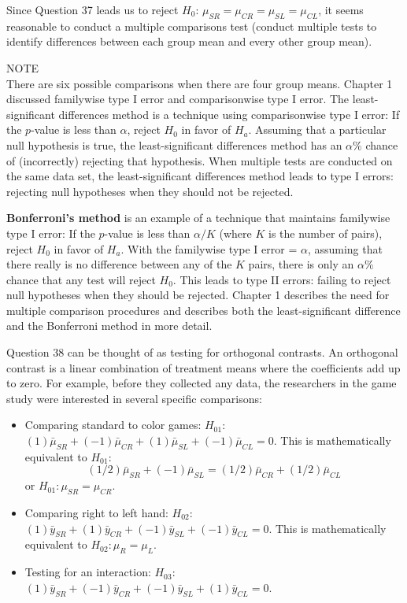 \documentclass[
]{report}
\providecommand{\tightlist}{%
  \setlength{\itemsep}{0pt}\setlength{\parskip}{0pt}}
\begin{document}
Since Question 37 leads us to reject \(H_0\): \(\mu_{SR} = \mu_{CR} = \mu_{SL} = \mu_{CL}\), it seems reasonable to conduct a multiple comparisons test (conduct multiple tests to identify differences between each group mean and every other group mean).

NOTE\\
There are six possible comparisons when there are four group means. Chapter 1 discussed familywise type I error and comparisonwise type I error. The least-significant differences method is a technique using comparisonwise type I error: If the \(p\)-value is less than \(\alpha\), reject \(H_0\) in favor of \(H_a\). Assuming that a particular null hypothesis is true, the least-significant differences method has an \(\alpha\%\) chance of (incorrectly) rejecting that hypothesis. When multiple tests are conducted on the same data set, the least-significant differences method leads to type I errors: rejecting null hypotheses when they should not be rejected.

\textbf{Bonferroni's method} is an example of a technique that maintains familywise type I error: If the \(p\)-value is less than \(\alpha/K\) (where \(K\) is the number of pairs), reject \(H_0\) in favor of \(H_a\). With the familywise type I error = \(\alpha\), assuming that there really is no difference between any of the \(K\) pairs, there is only an \(\alpha\%\) chance that any test will reject \(H_0\). This leads to type II errors: failing to reject null hypotheses when they should be rejected. Chapter 1 describes the need for multiple comparison procedures and describes both the least-significant difference and the Bonferroni method in more detail.

Question 38 can be thought of as testing for orthogonal contrasts. An orthogonal contrast is a linear combination of treatment means where the coefficients add up to zero. For example, before they collected any data, the researchers in the game study were interested in several specific comparisons:

\begin{itemize}
\tightlist
\item
  Comparing standard to color games: \(H_{01}:\) \((1)\bar \mu_{SR} + (-1)\bar \mu_{CR} + (1)\bar \mu_{SL} + (-1)\bar \mu_{CL} = 0\). This is mathematically equivalent to \(H_{01}:\) \[(1/2)\bar \mu_{SR} + (-1)\bar \mu_{SL} = (1/2)\bar \mu_{CR} + (1/2)\bar\mu_{CL} \] or \(H_{01}: \mu_{SR} = \mu_{CR}\).
\item
  Comparing right to left hand: \(H_{02}:\) \((1)\bar y_{SR} + (1)\bar y_{CR} + (-1)\bar y_{SL} + (-1)\bar y_{CL} = 0\). This is mathematically equivalent to \(H_{02}: \mu_{R} = \mu_{L}\).
\item
  Testing for an interaction: \(H_{03}:\) \((1)\bar y_{SR} + (-1)\bar y_{CR} + (-1)\bar y_{SL} + (1)\bar y_{CL} = 0\).
\end{itemize}
\end{document}
